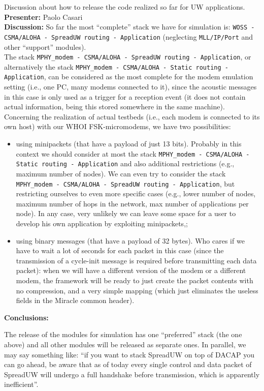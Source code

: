 \documentclass[11pt,journal,draftclsnofoot,onecolumn,twoside,letterpaper]{IEEEtran}
\theoremstyle{definition} \newtheorem{definition}[]{Definition}
\theoremstyle{theorem} \newtheorem{theorem}[]{Theorem}
\begin{document}
 Discussion about how to release the code realized so far for UW applications.\\
{\bf Presenter:} Paolo Casari\\
{\bf Discussion:} So far the most ``complete'' stack we have for simulation is: {\tt WOSS - CSMA/ALOHA - SpreadUW routing - Application} (neglecting {\tt MLL/IP/Port} and other ``support'' modules).\\
The stack {\tt MPHY\_modem - CSMA/ALOHA - SpreadUW routing - Application}, or alternatively the stack {\tt MPHY\_modem - CSMA/ALOHA - Static routing - Application}, can be considered as the most complete for the modem emulation setting (i.e., one PC, many modems connected to it), since the acoustic messages in this case is only used as a trigger for a reception event (it does not contain actual information, being this stored somewhere in the same machine).\\
Concerning the realization of actual testbeds (i.e., each modem is connected to its own host) with our WHOI FSK-micromodems, we have two possibilities:
\begin{itemize}
 \item using minipackets (that have a payload of just 13 bits). Probably in this context we should consider at most the stack {\tt MPHY\_modem - CSMA/ALOHA - Static routing - Application} and also additional restrictions (e.g., maximum number of nodes). We can even try to consider the stack {\tt MPHY\_modem - CSMA/ALOHA - SpreadUW routing - Application}, but restricting ourselves to even more specific cases (e.g., lower number of nodes, maximum number of hops in the network, max number of applications per node). In any case, very unlikely we can leave some space for a user to develop his own application by exploiting minipackets,;
\item using binary messages (that have a payload of 32 bytes). Who cares if we have to wait a lot of seconds for each packet in this case (since the transmission of a cycle-init message is required before transmitting each data packet): when we will have a different version of the modem or a different modem, the framework will be ready to just create the packet contents with no compression, and a very simple mapping (which just eliminates the useless fields in the Miracle common header).
\end{itemize}

{\bf Conclusions:}

The release of the modules for simulation has one ``preferred'' stack (the one above) and all other modules will be released as separate ones. In parallel, we may say something like: ``if you want to stack SpreadUW on top of DACAP you can go ahead, be aware that as of today every single control and data packet of SpreadUW will undergo a full handshake before transmission, which is apparently inefficient''.
\end{document}
